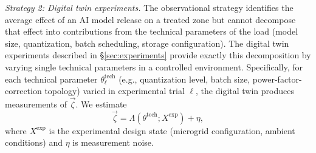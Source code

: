 \documentclass[12pt,letterpaper]{article}
\begin{document}
\emph{Strategy 2: Digital twin experiments.} The observational strategy
identifies the average effect of an AI model release on a treated zone but
cannot decompose that effect into contributions from the technical
parameters of the load (model size, quantization, batch scheduling, storage
configuration). The digital twin experiments described in
\S\ref{sec:experiments} provide exactly this decomposition by varying
single technical parameters in a controlled environment. Specifically,
for each technical parameter $\theta^{\text{tech}}_\ell$ (e.g., quantization
level, batch size, power-factor-correction topology) varied in experimental
trial $\ell$, the digital twin produces measurements of $\vec\zeta$. We
estimate
\begin{equation}
\label{eq:zeta_map}
\vec\zeta = \Lambda(\theta^{\text{tech}}; X^{\text{exp}}) + \eta,
\end{equation}
where $X^{\text{exp}}$ is the experimental design state (microgrid
configuration, ambient conditions) and $\eta$ is measurement noise.
\end{document}
